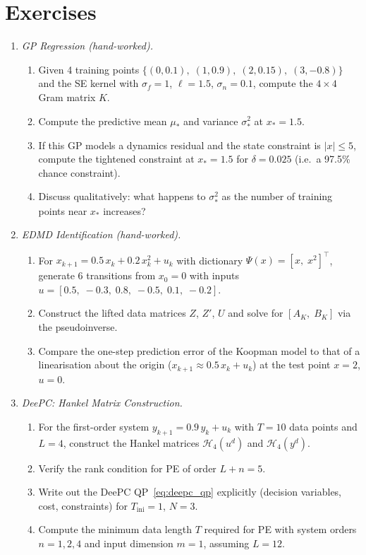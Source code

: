 \section*{Exercises}

\begin{enumerate}
	\item \emph{GP Regression (hand-worked).}
	\begin{enumerate}
		\item Given 4 training points $\{(0, 0.1),\; (1, 0.9),\; (2, 0.15),\; (3, -0.8)\}$ and the SE kernel with $\sigma_f = 1$, $\ell = 1.5$, $\sigma_n = 0.1$, compute the $4 \times 4$ Gram matrix $K$.
		\item Compute the predictive mean $\mu_*$ and variance $\sigma_*^2$ at $x_* = 1.5$.
		\item If this GP models a dynamics residual and the state constraint is $|x| \le 5$, compute the tightened constraint at $x_* = 1.5$ for $\delta = 0.025$ (i.e.\ a 97.5\% chance constraint).
		\item Discuss qualitatively: what happens to $\sigma_*^2$ as the number of training points near $x_*$ increases?
	\end{enumerate}

	\item \emph{EDMD Identification (hand-worked).}
	\begin{enumerate}
		\item For $x_{k+1} = 0.5\,x_k + 0.2\,x_k^2 + u_k$ with dictionary $\Psi(x) = [x,\; x^2]^\top$, generate 6 transitions from $x_0 = 0$ with inputs $u = [0.5,\; -0.3,\; 0.8,\; -0.5,\; 0.1,\; -0.2]$.
		\item Construct the lifted data matrices $Z$, $Z'$, $U$ and solve for $[A_K,\; B_K]$ via the pseudoinverse.
		\item Compare the one-step prediction error of the Koopman model to that of a linearisation about the origin ($x_{k+1} \approx 0.5\,x_k + u_k$) at the test point $x = 2$, $u = 0$.
	\end{enumerate}

	\item \emph{DeePC: Hankel Matrix Construction.}
	\begin{enumerate}
		\item For the first-order system $y_{k+1} = 0.9\,y_k + u_k$ with $T = 10$ data points and $L = 4$, construct the Hankel matrices $\mathcal{H}_4(u^d)$ and $\mathcal{H}_4(y^d)$.
		\item Verify the rank condition for PE of order $L + n = 5$.
		\item Write out the DeePC QP~\eqref{eq:deepc_qp} explicitly (decision variables, cost, constraints) for $T_\text{ini} = 1$, $N = 3$.
		\item Compute the minimum data length $T$ required for PE with system orders $n = 1, 2, 4$ and input dimension $m = 1$, assuming $L = 12$.
	\end{enumerate}


\end{enumerate}
